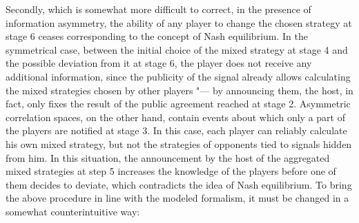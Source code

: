 Secondly, which is somewhat more difficult to correct, in the presence of information asymmetry, the ability of any player to change the chosen strategy at stage 6 ceases corresponding to the concept of Nash equilibrium. In the symmetrical case, between the initial choice of the mixed strategy at stage 4 and the possible deviation from it at stage 6, the player does not receive any additional information, since the publicity of the signal already allows calculating the mixed strategies chosen by other players "--- by announcing them, the host, in fact, only fixes the result of the public agreement reached at stage 2. Asymmetric correlation spaces, on the other hand, contain events about which only a part of the players are notified at stage 3. In this case, each player can reliably calculate his own mixed strategy, but not the strategies of opponents tied to signals hidden from him. In this situation, the announcement by the host of the aggregated mixed strategies at step 5 increases the knowledge of the players before one of them decides to deviate, which contradicts the idea of Nash equilibrium. To bring the above procedure in line with the modeled formalism, it must be changed in a somewhat counterintuitive way: %

